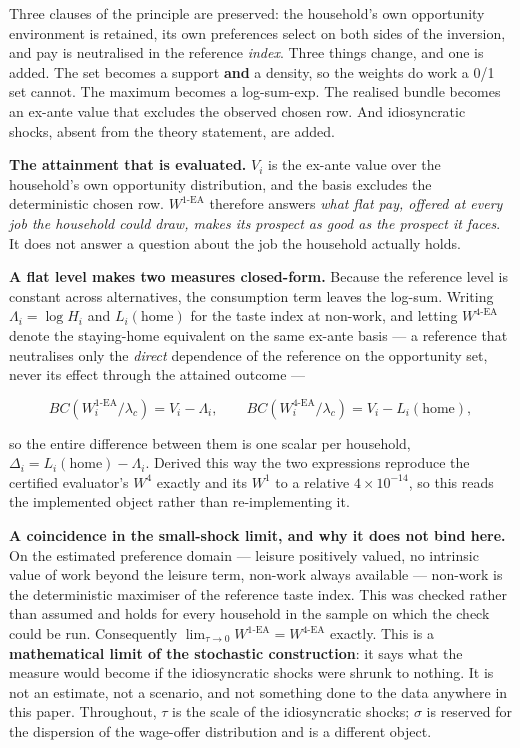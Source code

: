 \documentclass[11pt,a4paper]{article}
\begin{document}
Three clauses of the principle are preserved: the household's own opportunity environment is retained, its own preferences select on both sides of the inversion, and pay is neutralised in the reference \emph{index}. Three things change, and one is added. The set becomes a support \textbf{and} a density, so the weights do work a 0/1 set cannot. The maximum becomes a log-sum-exp. The realised bundle becomes an ex-ante value that excludes the observed chosen row. And idiosyncratic shocks, absent from the theory statement, are added.

\textbf{The attainment that is evaluated.} \(V_i\) is the ex-ante value over the household's own opportunity distribution, and the basis excludes the deterministic chosen row. \(W^{1\text{-EA}}\) therefore answers \emph{what flat pay, offered at every job the household could draw, makes its prospect as good as the prospect it faces}. It does not answer a question about the job the household actually holds.

\textbf{A flat level makes two measures closed-form.} Because the reference level is constant across alternatives, the consumption term leaves the log-sum. Writing \(\Lambda_i=\log H_i\) and \(L_i(\text{home})\) for the taste index at non-work, and letting \(W^{4\text{-EA}}\) denote the staying-home equivalent on the same ex-ante basis --- a reference that neutralises only the \emph{direct} dependence of the reference on the opportunity set, never its effect through the attained outcome ---

\[BC(W^{1\text{-EA}}_i/\lambda_c)=V_i-\Lambda_i,\qquad BC(W^{4\text{-EA}}_i/\lambda_c)=V_i-L_i(\text{home}),\]

so the entire difference between them is one scalar per household, \(\Delta_i=L_i(\text{home})-\Lambda_i\). Derived this way the two expressions reproduce the certified evaluator's \(W^4\) exactly and its \(W^1\) to a relative \(4\times10^{-14}\), so this reads the implemented object rather than re-implementing it.

\textbf{A coincidence in the small-shock limit, and why it does not bind here.} On the estimated preference domain --- leisure positively valued, no intrinsic value of work beyond the leisure term, non-work always available --- non-work is the deterministic maximiser of the reference taste index. This was checked rather than assumed and holds for every household in the sample on which the check could be run. Consequently \(\lim_{\tau\to0}W^{1\text{-EA}}=W^{4\text{-EA}}\) exactly. This is a \textbf{mathematical limit of the stochastic construction}: it says what the measure would become if the idiosyncratic shocks were shrunk to nothing. It is not an estimate, not a scenario, and not something done to the data anywhere in this paper. Throughout, \(\tau\) is the scale of the idiosyncratic shocks; \(\sigma\) is reserved for the dispersion of the wage-offer distribution and is a different object.
\end{document}
